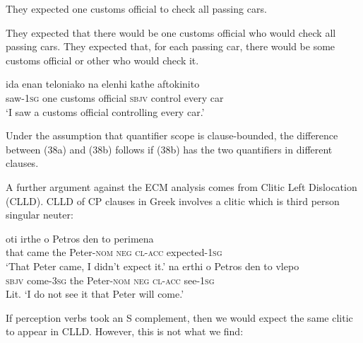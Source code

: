 \documentclass[output=paper]{langsci/langscibook}
\begin{document}
\ea%
    \label{ex:alexiadou:38}
    \ea They expected one customs official to check all passing cars.\\
    \begin{xlisti}
    \ex They expected that there would be one customs official who would         check all passing cars.
    \ex They expected that, for each passing car, there would be some           customs official or other who would check it.  
    \end{xlisti}
    \ex 
    \gll ida          enan teloniako            na       elenhi   kathe  aftokinito\\
        saw{}-\textsc{1sg}   one   customs official  \textsc{sbjv} control  every  car\\
    \glt ‘I saw a customs official controlling every car.’
    \begin{xlisti}
    \end{xlisti}
    \z
\z

Under the assumption that quantifier scope is clause-bounded, the difference between (38a) and (38b) follows if (38b) has the two quantifiers in different clauses. 

  A further argument against the ECM analysis comes from Clitic Left Dislocation (CLLD). CLLD of CP clauses in Greek involves a clitic which is third person singular neuter:

\ea%
    \label{ex:alexiadou:39}
    \ea
    \gll oti   irthe   o     Petros      den  to       perimena\\
          that  came the  Peter-\textsc{nom  neg}  \textsc{cl-acc} expected{}-\textsc{1sg}\\
    \glt ‘That Peter came, I didn't expect it.’
    \ex
    \gll na    erthi         o   Petros       den   to      vlepo\\
         \textsc{sbjv} come{}-\textsc{3sg} the Peter-\textsc{nom  neg}  \textsc{cl-acc} see{}-\textsc{1sg}\\
    \glt Lit. ‘I do not see it that Peter will come.’
    \z
\z    
 
If perception verbs took an S complement, then we would expect the same clitic to appear in CLLD. However, this is not what we find:
\end{document}

